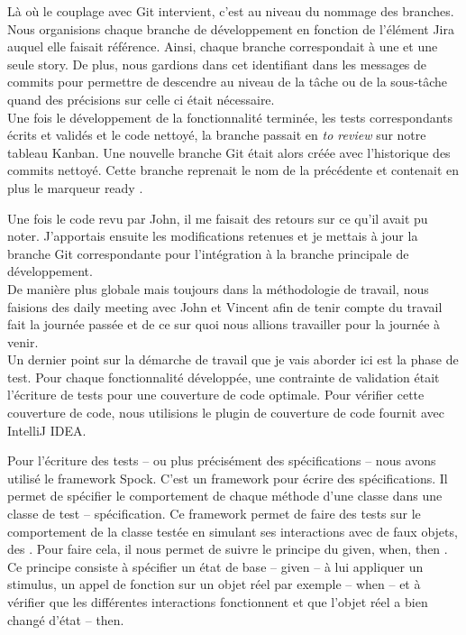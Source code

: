 Là où le couplage avec Git intervient, c'est au niveau du nommage des branches.
Nous organisions chaque branche de développement en fonction de l'élément Jira
auquel elle faisait référence. Ainsi, chaque branche correspondait à une et une
seule story. De plus, nous gardions dans cet identifiant dans les messages de
commits pour permettre de descendre au niveau de la tâche ou de la sous-tâche
quand des précisions sur celle ci était nécessaire.\\

Une fois le développement de la fonctionnalité terminée, les tests correspondants
écrits et validés et le code nettoyé, la branche passait en {\em \og to review
\fg{} } sur notre tableau Kanban. Une nouvelle branche Git était alors créée
avec l'historique des commits nettoyé. Cette branche reprenait le nom de la
précédente et contenait en plus le marqueur \og ready \fg{}.

Une fois le code revu par John, il me faisait des retours sur ce qu'il avait pu
noter. J'apportais ensuite les modifications retenues et je mettais à jour la
branche Git correspondante pour l'intégration à la branche principale de
développement.\\

De manière plus globale mais toujours dans la méthodologie de travail, nous
faisions des \og daily meeting \fg{} avec John et Vincent afin de tenir compte du
travail fait la journée passée et de ce sur quoi nous allions travailler pour la
journée à venir.\\

Un dernier point sur la démarche de travail que je vais aborder ici est la phase
de test. Pour chaque fonctionnalité développée, une contrainte de validation
était l'écriture de tests pour une couverture de code optimale. Pour vérifier
cette couverture de code, nous utilisions le plugin de couverture de code
fournit avec IntelliJ IDEA.

Pour l'écriture des tests -- ou plus précisément des spécifications -- nous
avons utilisé le framework Spock. C'est un framework pour écrire des
spécifications. Il permet de spécifier le comportement de chaque méthode d'une
classe dans une classe de test -- spécification. Ce framework permet de faire
des tests sur le comportement de la classe testée en simulant ses interactions
avec de faux objets, des . Pour faire cela, il nous permet de suivre
le principe du \og given, when, then \fg{}. Ce principe consiste à spécifier un
état de base -- given -- à lui appliquer un stimulus, un appel de fonction sur un
objet réel par exemple -- when -- et à vérifier que les différentes
interactions fonctionnent et que l'objet réel a bien changé d'état -- then.


